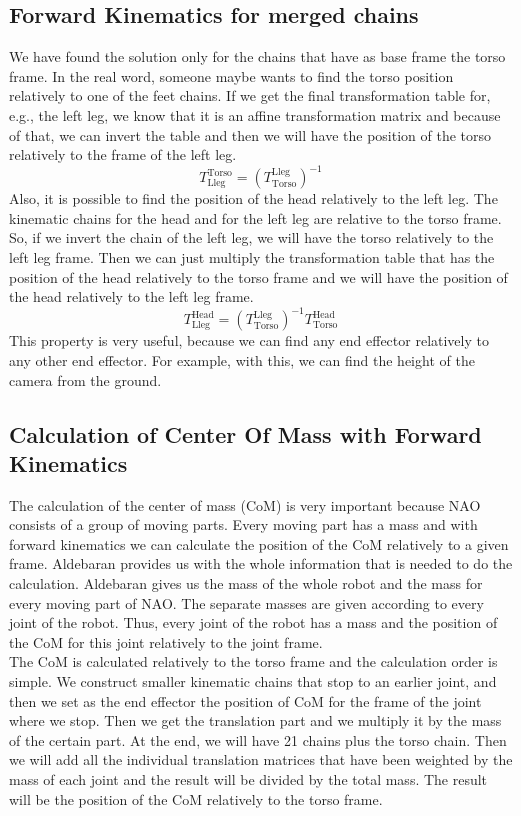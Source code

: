 \subsection{Forward Kinematics for merged chains}
We have found the solution only for the chains that have as base frame the torso frame. In the real word, someone maybe wants to find the torso position relatively to one of the feet chains. If we get the final transformation table for, e.g., the left leg, we know that it is an affine transformation matrix and because of that, we can invert the table and then we will have the position of the torso relatively to the frame of the left leg. 
\[
T^\text{Torso}_\text{Lleg} = {\left(T^\text{Lleg}_\text{Torso}\right)}^{-1}
\]
Also, it is possible to find the position of the head relatively to the left leg. The kinematic chains for the head and for the left leg are relative to the torso frame. So, if we invert the chain of the left leg, we will have the torso relatively to the left leg frame. Then we can just multiply the transformation table that has the position of the head relatively to the torso frame and we will have the position of the head relatively to the left leg frame.
\[
T^\text{Head}_\text{Lleg} = {\left(T^\text{Lleg}_\text{Torso}\right)}^{-1}T^\text{Head}_\text{Torso}
\]
This property is very useful, because we can find any end effector relatively to any other end effector. For example, with this, we can find the height of the camera from the ground.

\subsection{Calculation of Center Of Mass with Forward Kinematics}
The calculation of the center of mass (CoM) is very important because NAO consists of a group of moving parts. Every moving part has a mass and with forward kinematics we can calculate the position of the CoM relatively to a given frame. Aldebaran provides us with the whole information that is needed to do the calculation. Aldebaran gives us the mass of the whole robot and the mass for every moving part of NAO. The separate masses are given according to every joint of the robot. Thus, every joint of the robot has a mass and the position of the CoM for this joint relatively to the joint frame.\\
The CoM is calculated relatively to the torso frame and the calculation order is simple. We construct smaller kinematic chains that stop to an earlier joint, and then we set as the end effector the position of CoM for the frame of the joint where we stop. Then we get the translation part and we multiply it by the mass of the certain part. At the end, we will have 21 chains plus the torso chain. Then we will add all the individual translation matrices that have been weighted by the mass of each joint and the result will be divided by the total mass. The result will be the position of the CoM relatively to the torso frame.
